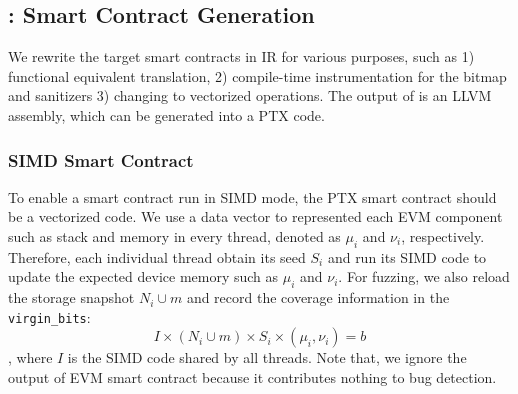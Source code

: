 \subsection{{\translator}: Smart Contract Generation}
\label{design:translator}
We rewrite the target smart contracts in IR for various purposes, such as 1) functional equivalent translation, 2) compile-time instrumentation for the bitmap and sanitizers 3) changing to vectorized operations.
%
The output of {\translator} is an LLVM assembly, which can be generated into a PTX code.
%

\subsubsection{SIMD Smart Contract}
To enable a smart contract run in SIMD mode, the PTX smart contract should be a vectorized code\cite{nuzman2011vapor}. 
%
We use a data vector to represented each EVM component such as stack and memory in every thread, denoted as $\mu_i$ and $\nu_i$, respectively. 
Therefore, each individual thread obtain its seed $S_i$ and run its SIMD code to update the expected device memory such as $\mu_i$ and $\nu_i$. For fuzzing, we also reload the storage snapshot $N_i \cup m$ and record the coverage information in the \texttt{virgin\_bits}:
$$
I \times (N_i \cup m) \times S_i \times (\mu_i, \nu_i) = b
$$
, where $I$ is the SIMD code shared by all threads. 
Note that, we ignore the output of EVM smart contract because it contributes nothing to bug detection.
%

